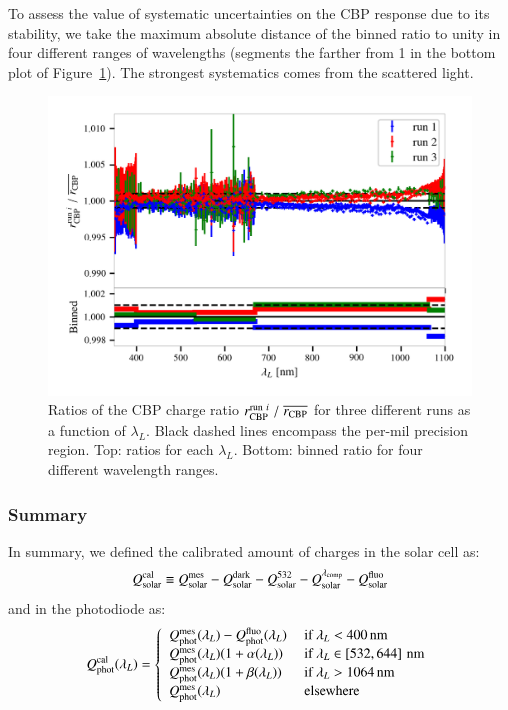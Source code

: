 To assess the value of systematic uncertainties on the CBP response due to its stability, we take the maximum absolute distance of the binned ratio to unity in four different ranges of wavelengths (segments the farther from 1 in the bottom plot of Figure~\ref{fig:SCrepeatability}). The strongest systematics comes from the scattered light.

\begin{figure}[h]
    \centering
    \includegraphics[width=\columnwidth]{fig/sc_runi_ratios.png}
    \caption{Ratios of the CBP charge ratio $r_{\rm CBP}^{\mathrm{run}\ i}\;/\;\overline{r_{\rm CBP}}$ for three different runs as a function of $\lambda_L$. Black dashed lines encompass the per-mil precision region. Top: ratios for each $\lambda_L$. Bottom: binned ratio for four different wavelength ranges.}
    \label{fig:SCrepeatability}
\end{figure}

\subsubsection{Summary}\label{sec:cbp_summary}

In summary, we defined the calibrated amount of charges in the solar cell as:
\begin{equation}
Q_{\mathrm{solar}}^{\mathrm{cal}} \equiv Q_{\mathrm{solar}}^{\mathrm{mes}} - Q_{\mathrm{solar}}^{\rm dark} - Q_{\mathrm{solar}}^{532} - Q_{\mathrm{solar}}^{\lambda_{\rm comp}} - Q_{\mathrm{solar}}^{\rm fluo}
\end{equation}
and in the photodiode as:
\begin{equation}
\Qphotcal(\lambda_L) = \left\lbrace
\begin{array}{ll}
          \Qphotmes(\lambda_L) - \Qphot^{\mathrm{fluo}}(\lambda_L) &\ \text{if}\ \lambda_L < \SI{400}{\nano\meter} \\
         \Qphotmes(\lambda_L)(1 + \alpha(\lambda_L)) &\ \text{if}\ \lambda_L \in \left[532, 644\right]\mathrm{\,nm} \\
        \Qphotmes(\lambda_L)(1 + \beta(\lambda_L)) &\ \text{if}\ \lambda_L > \SI{1064}{\nano\meter} \\
        \Qphotmes(\lambda_L)&\ \text{elsewhere}
\end{array}\right. 
\end{equation}


